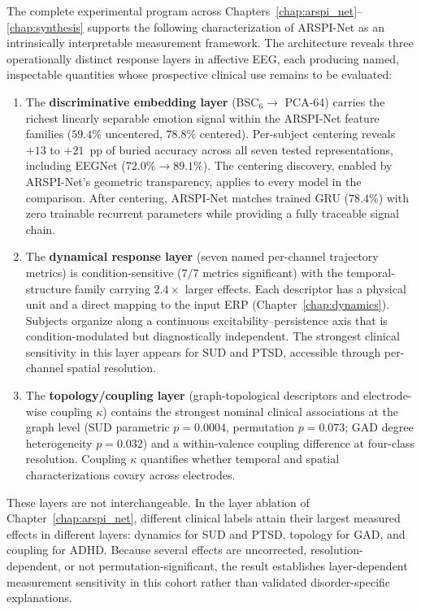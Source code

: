 The complete experimental program across Chapters~\ref{chap:arspi_net}--\ref{chap:synthesis} supports the following characterization of ARSPI-Net as an intrinsically interpretable measurement framework. The architecture reveals three operationally distinct response layers in affective EEG, each producing named, inspectable quantities whose prospective clinical use remains to be evaluated:
\begin{enumerate}
    \item The \textbf{discriminative embedding layer} (BSC$_6 \to$ PCA-64) carries the richest linearly separable emotion signal within the ARSPI-Net feature families ($59.4\%$ uncentered, $78.8\%$ centered). Per-subject centering reveals $+13$ to $+21$~pp of buried accuracy across all seven tested representations, including EEGNet ($72.0\% \to 89.1\%$). The centering discovery, enabled by ARSPI-Net's geometric transparency, applies to every model in the comparison. After centering, ARSPI-Net matches trained GRU ($78.4\%$) with zero trainable recurrent parameters while providing a fully traceable signal chain.
    \item The \textbf{dynamical response layer} (seven named per-channel trajectory metrics) is condition-sensitive ($7/7$ metrics significant) with the temporal-structure family carrying $2.4\times$ larger effects. Each descriptor has a physical unit and a direct mapping to the input ERP (Chapter~\ref{chap:dynamics}). Subjects organize along a continuous excitability--persistence axis that is condition-modulated but diagnostically independent. The strongest clinical sensitivity in this layer appears for SUD and PTSD, accessible through per-channel spatial resolution.
    \item The \textbf{topology/coupling layer} (graph-topological descriptors and electrode-wise coupling $\kappa$) contains the strongest nominal clinical associations at the graph level (SUD parametric $p = 0.0004$, permutation $p = 0.073$; GAD degree heterogeneity $p = 0.032$) and a within-valence coupling difference at four-class resolution. Coupling $\kappa$ quantifies whether temporal and spatial characterizations covary across electrodes.
\end{enumerate}
These layers are not interchangeable. In the layer ablation of Chapter~\ref{chap:arspi_net}, different clinical labels attain their largest measured effects in different layers: dynamics for SUD and PTSD, topology for GAD, and coupling for ADHD. Because several effects are uncorrected, resolution-dependent, or not permutation-significant, the result establishes layer-dependent measurement sensitivity in this cohort rather than validated disorder-specific explanations.

